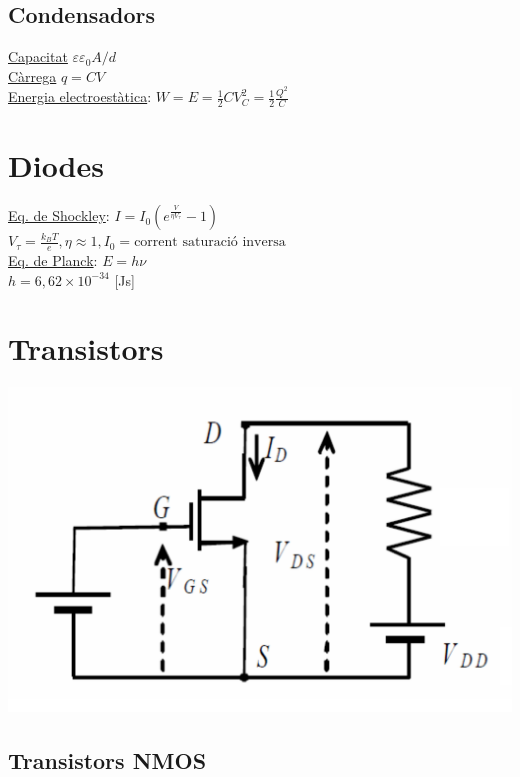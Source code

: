 \documentclass[12pt]{article}
\begin{document}
\raggedright
\begin{multicols}{4}

\subsection{Condensadors}

\underline{Capacitat} $\varepsilon \varepsilon_0 A / d$ \\
\underline{Càrrega} $q = CV$ \\
\underline{Energia electroestàtica}: $W = E = \frac{1}{2}CV_C^2 = \frac{1}{2}\frac{Q^2}{C}$

\section{Diodes}

\underline{Eq. de Shockley}: $I = I_0 \left( e^{\frac{V}{\eta V_\tau}} -1 \right)$ \\
$V_\tau = \frac{k_BT}{e}, \eta \approx 1, I_0 = \text{corrent saturació inversa}$ \\
\underline{Eq. de Planck}: $E = h \nu$ \\
$h = 6,62 \times 10^{-34}$ [Js]

\section{Transistors}

\includegraphics[width=\linewidth]{Figures/Figura1.pdf}

\subsection{Transistors NMOS}


\end{multicols}
\end{document}

